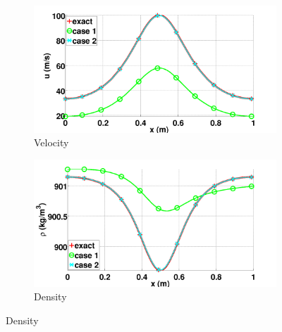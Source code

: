 \documentclass[preprint,10pt]{elsarticle}
\begin{document}
%
\begin{figure}[H]
        \centering
        \begin{subfigure}[b]{0.5\textwidth}
                \centering
                \includegraphics[width=\textwidth]{figures/liquid_velocity_llf_and_exact_100.png}
                \caption{Velocity}
                \label{fig:liq-phase-vel}
        \end{subfigure}%
        \begin{subfigure}[b]{0.5\textwidth}
                \centering
                \includegraphics[width=\textwidth]{figures/liquid_density_llf_and_exact_100.png}
                \caption{Density}
                \label{fig:liq-phase-density}
        \end{subfigure}
        

\end{figure}
\end{document}
